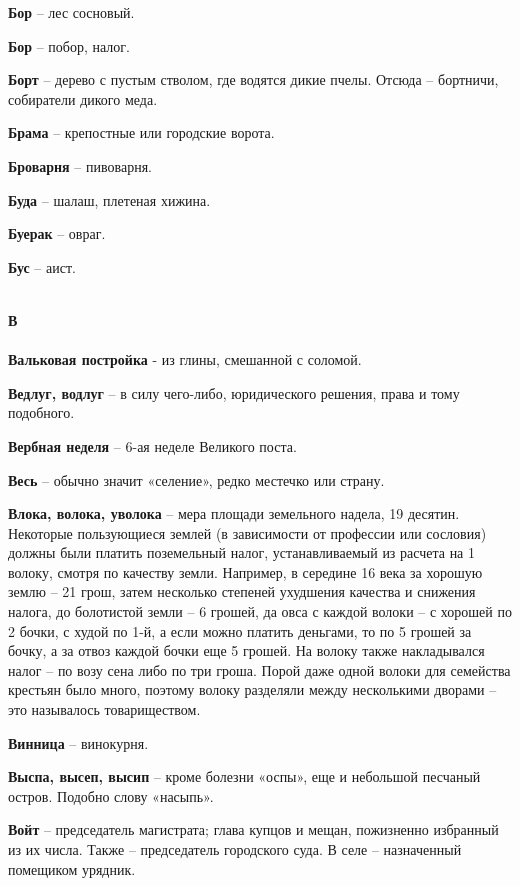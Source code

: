 \begin{multicols}{2}
\textbf{Бор} – лес сосновый.

\textbf{Бор} – побор, налог.


\textbf{Борт} – дерево с пустым стволом, где водятся дикие пчелы. Отсюда – бортничи, собиратели дикого меда.

\textbf{Брама} – крепостные или городские ворота.

\textbf{Броварня} – пивоварня.

\textbf{Буда} – шалаш, плетеная хижина.

\textbf{Буерак} – овраг.

\textbf{Бус} – аист.

\mbox{ }\\
\textbf{В\\}
\mbox{ }\\

\textbf{Вальковая постройка} - из глины, смешанной с соломой.

\textbf{Ведлуг, водлуг} – в силу чего-либо, юридического решения, права и тому подобного.

\textbf{Вербная неделя} – 6-ая неделе Великого поста.

\textbf{Весь} – обычно значит «селение», редко местечко или страну.

\textbf{Влока, волока, уволока} – мера площади земельного надела, 19 десятин. Некоторые пользующиеся землей (в зависимости от профессии или сословия) должны были платить поземельный налог, устанавливаемый из расчета на 1 волоку, смотря по качеству земли. Например, в середине 16 века за хорошую землю – 21 грош, затем несколько степеней ухудшения качества и снижения налога, до болотистой земли – 6 грошей, да овса с каждой волоки – с хорошей по 2 бочки, с худой по 1-й, а если можно платить деньгами, то по 5 грошей за бочку, а за отвоз каждой бочки еще 5 грошей. На волоку также накладывался налог – по возу сена либо по три гроша. Порой даже одной волоки для семейства крестьян было много, поэтому волоку разделяли между несколькими дворами – это называлось товариществом.


\textbf{Винница} – винокурня.

\textbf{Выспа, высеп, высип} – кроме болезни «оспы», еще и небольшой песчаный остров. Подобно слову «насыпь».

\textbf{Войт} – председатель магистрата; глава купцов и мещан, пожизненно избранный из их числа. Также – председатель городского суда. В селе – назначенный помещиком урядник. 


\end{multicols}
